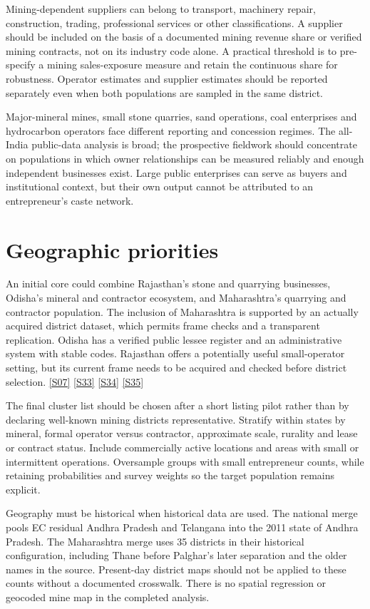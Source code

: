 \documentclass[11pt,a4paper]{report}
\begin{document}
Mining-dependent suppliers can belong to transport, machinery repair, construction, trading, professional services or other classifications. A supplier should be included on the basis of a documented mining revenue share or verified mining contracts, not on its industry code alone. A practical threshold is to pre-specify a mining sales-exposure measure and retain the continuous share for robustness. Operator estimates and supplier estimates should be reported separately even when both populations are sampled in the same district.

Major-mineral mines, small stone quarries, sand operations, coal enterprises and hydrocarbon operators face different reporting and concession regimes. The all-India public-data analysis is broad; the prospective fieldwork should concentrate on populations in which owner relationships can be measured reliably and enough independent businesses exist. Large public enterprises can serve as buyers and institutional context, but their own output cannot be attributed to an entrepreneur's caste network.

\section{Geographic priorities}
An initial core could combine Rajasthan's stone and quarrying businesses, Odisha's mineral and contractor ecosystem, and Maharashtra's quarrying and contractor population. The inclusion of Maharashtra is supported by an actually acquired district dataset, which permits frame checks and a transparent replication. Odisha has a verified public lessee register and an administrative system with stable codes. Rajasthan offers a potentially useful small-operator setting, but its current frame needs to be acquired and checked before district selection. \hyperlink{S07}{[S07]} \hyperlink{S33}{[S33]} \hyperlink{S34}{[S34]} \hyperlink{S35}{[S35]}

The final cluster list should be chosen after a short listing pilot rather than by declaring well-known mining districts representative. Stratify within states by mineral, formal operator versus contractor, approximate scale, rurality and lease or contract status. Include commercially active locations and areas with small or intermittent operations. Oversample groups with small entrepreneur counts, while retaining probabilities and survey weights so the target population remains explicit.

Geography must be historical when historical data are used. The national merge pools EC residual Andhra Pradesh and Telangana into the 2011 state of Andhra Pradesh. The Maharashtra merge uses 35 districts in their historical configuration, including Thane before Palghar's later separation and the older names in the source. Present-day district maps should not be applied to these counts without a documented crosswalk. There is no spatial regression or geocoded mine map in the completed analysis.
\end{document}
